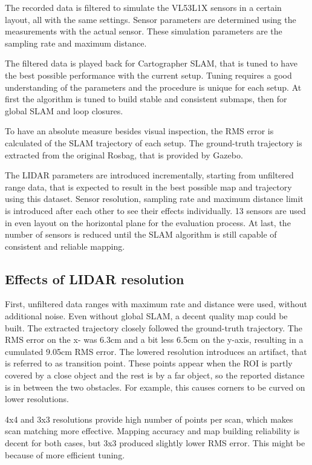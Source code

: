 \documentclass[conference]{IEEEtran}
\begin{document}
The recorded data is filtered to simulate the VL53L1X sensors in a certain layout, all with the same settings. 
Sensor parameters are determined using the measurements with the actual sensor. These simulation parameters are
the sampling rate and maximum distance. 

The filtered data is played back for Cartographer SLAM, that is tuned to have the best possible performance
with the current setup. Tuning requires a good understanding of the parameters and the procedure is unique for
each setup. At first the algorithm is tuned to build stable and consistent submaps, then for global SLAM and
loop closures.

To have an absolute measure besides visual inspection, the RMS error is calculated of the SLAM trajectory of 
each setup. The ground-truth trajectory is extracted from the original Rosbag, that is provided by Gazebo.

 
The LIDAR parameters are introduced incrementally, starting from unfiltered range data, that is expected to 
result in the best possible map and trajectory using this dataset. Sensor resolution, sampling rate and 
maximum distance limit is introduced after each other to see their effects individually. 13 sensors are used
in even layout on the horizontal plane for the evaluation process. At last, the number of sensors is reduced
until the SLAM algorithm is still capable of consistent and reliable mapping.

\subsection{Effects of LIDAR resolution}

First, unfiltered data ranges with maximum rate and distance were used, without additional noise.
Even without global SLAM, a decent quality map could be built. The extracted trajectory closely followed 
the ground-truth trajectory. The RMS error on the x- was 6.3cm and a bit less 6.5cm on the y-axis, resulting 
in a cumulated 9.05cm RMS error. The lowered resolution introduces an artifact, that is referred to as transition
point. These points appear when the ROI is partly covered by a close object and the rest is by a far object, so 
the reported distance is in between the two obstacles. For example, this causes corners to be curved on lower 
resolutions.

4x4 and 3x3 resolutions provide high number of points per scan, which makes scan matching more effective. 
Mapping accuracy and map building reliability is decent for both cases, but 3x3 produced slightly lower RMS error.
This might be because of more efficient tuning. 
\end{document}
